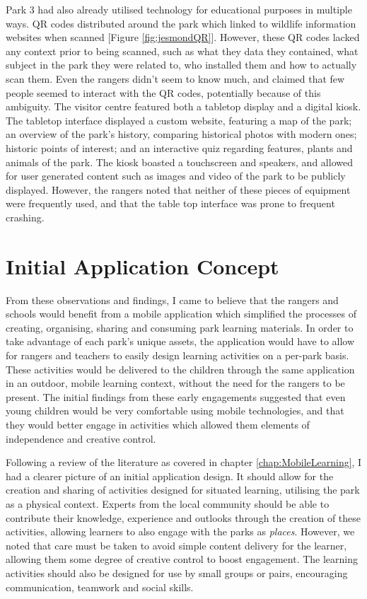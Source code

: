 Park 3 had also already utilised technology for educational purposes in multiple ways. QR codes distributed around the park which linked to wildlife information websites when scanned [Figure \ref{fig:jesmondQR}]. However, these QR codes lacked any context prior to being scanned, such as what they data they contained, what subject in the park they were related to, who installed them and how to actually scan them. Even the rangers didn't seem to know much, and claimed that few people seemed to interact with the QR codes, potentially because of this ambiguity. The visitor centre featured both a tabletop display and a digital kiosk. The tabletop interface displayed a custom website, featuring a map of the park; an overview of the park's history, comparing historical photos with modern ones; historic points of interest; and an interactive quiz regarding features, plants and animals of the park. The kiosk boasted a touchscreen and speakers, and allowed for user generated content such as images and video of the park to be publicly displayed. However, the rangers noted that neither of these pieces of equipment were frequently used, and that the table top interface was prone to frequent crashing.

\section{Initial Application Concept}

From these observations and findings, I came to believe that the rangers and schools would benefit from a mobile application which simplified the processes of creating, organising, sharing and consuming park learning materials. In order to take advantage of each park’s unique assets, the application would have to allow for rangers and teachers to easily design learning activities on a per-park basis. These activities would be delivered to the children through the same application in an outdoor, mobile learning context, without the need for the rangers to be present. The initial findings from these early engagements suggested that even young children would be very comfortable using mobile technologies, and that they would better engage in activities which allowed them elements of independence and creative control. 

Following a review of the literature as covered in chapter \ref{chap:MobileLearning}, I had a clearer picture of an initial application design. It should allow for the creation and sharing of activities designed for situated learning, utilising the park as a physical context. Experts from the local community should be able to contribute their knowledge, experience and outlooks through the creation of these activities, allowing learners to also engage with the parks as \textit{places}. However, we noted that care must be taken to avoid simple content delivery for the learner, allowing them some degree of creative control to boost engagement. The learning activities should also be designed for use by small groups or pairs, encouraging communication, teamwork and social skills.

